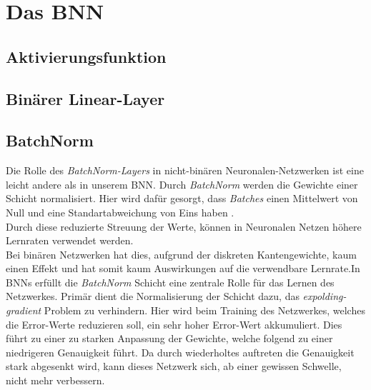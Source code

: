 \chapter{Das BNN}
\section{Aktivierungsfunktion}
\section{Binärer Linear-Layer}
\section{BatchNorm}
Die Rolle des \textit{BatchNorm-Layers} in nicht-binären Neuronalen-Netzwerken ist eine leicht andere als in unserem BNN. Durch \textit{BatchNorm} werden die Gewichte einer Schicht normalisiert. Hier wird dafür gesorgt, dass \textit{Batches} einen Mittelwert von Null und eine Standartabweichung von Eins haben .\\ %
Durch diese reduzierte Streuung der Werte, können in Neuronalen Netzen höhere Lernraten verwendet werden.\\
Bei binären Netzwerken hat dies, aufgrund der diskreten Kantengewichte, kaum einen Effekt und hat somit kaum Auswirkungen auf die verwendbare Lernrate.In BNNs erfüllt die \textit{BatchNorm} Schicht eine zentrale Rolle für das Lernen des Netzwerkes. Primär dient die Normalisierung der Schicht dazu, das \textit{expolding-gradient} Problem zu verhindern. Hier wird beim Training des Netzwerkes, welches die Error-Werte reduzieren soll, ein sehr hoher Error-Wert akkumuliert. Dies führt zu einer zu starken Anpassung der Gewichte, welche folgend zu einer niedrigeren Genauigkeit führt. Da durch wiederholtes auftreten die Genauigkeit stark abgesenkt wird, kann dieses Netzwerk sich, ab einer gewissen Schwelle, nicht mehr verbessern.%

